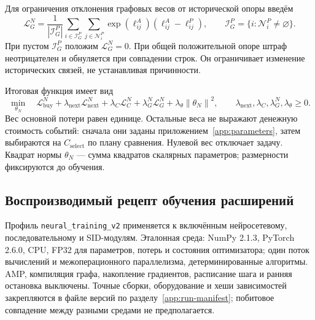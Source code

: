 \documentclass[12pt,a4paper]{article}
\newcommand{\code}[1]{{\ttfamily\small\nolinkurl{#1}}}
\newcommand{\norm}[1]{\left\lVert#1\right\rVert}
\theoremstyle{plainru}
\begin{document}
Для ограничения отклонения графовых весов от исторической опоры
введём
\begin{equation}\label{eq:modern-graph-regularizer}
\mathcal L_G^N=
\frac1{|\mathcal I_G^P|}
\sum_{i\in\mathcal I_G^P}\sum_{j\in\mathcal N_i^P}
\exp(\ell_{ij}^{A})(\ell_{ij}^{A}-\ell_{ij}^{P}),\qquad
\mathcal I_G^P=\{i:\mathcal N_i^P\ne\varnothing\}.
\end{equation}
При пустом $\mathcal I_G^P$ положим $\mathcal L_G^N=0$.
При общей положительной опоре штраф неотрицателен и обнуляется
при совпадении строк. Он ограничивает изменение исторических связей,
не устанавливая причинности.

Итоговая функция имеет вид
\begin{equation}\label{eq:modern-total-loss}
\min_{\theta_N}\quad
\mathcal L_{\mathrm{buy}}^N
+\lambda_{\mathrm{next}}\mathcal L_{\mathrm{next}}^N
+\lambda_C\mathcal L_C^N
+\lambda_G^N\mathcal L_G^N
+\lambda_\theta\norm{\theta_N}^2,
\qquad\lambda_{\mathrm{next}},\lambda_C,\lambda_G^N,\lambda_\theta\ge0.
\end{equation}
Вес основной потери равен единице. Остальные веса не выражают
денежную стоимость событий: сначала они заданы приложением~\ref{app:parameters},
затем выбираются на $C_{\mathrm{select}}$ по плану сравнения. Нулевой вес отключает задачу.
Квадрат нормы $\theta_N$ --- сумма квадратов скалярных параметров;
размерности фиксируются до обучения.

\subsection{Воспроизводимый рецепт обучения расширений}
\label{sec:modern-training-recipe}

Профиль \code{neural_training_v2} применяется к включённым нейросетевому,
последовательному и SID-модулям. Эталонная среда: NumPy 2.1.3, PyTorch 2.6.0,
CPU, FP32 для параметров, потерь и состояния оптимизатора; один поток
вычислений и межоперационного параллелизма, детерминированные алгоритмы.
AMP, компиляция графа, накопление градиентов, расписание шага и ранняя
остановка выключены. Точные сборки, оборудование и хеши зависимостей
закрепляются в файле версий по разделу~\ref{app:run-manifest};
побитовое совпадение между разными средами не предполагается.
\end{document}
